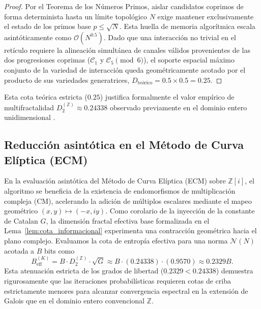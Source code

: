 \documentclass{article}
\numberwithin{equation}{section}
\theoremstyle{plain}
\theoremstyle{definition}
\begin{document}
\begin{proof}
Por el Teorema de los Números Primos, aislar candidatos coprimos de forma determinista hasta un límite topológico $N$ exige mantener exclusivamente el estado de los primos base $p \le \sqrt{N}$. Esta huella de memoria algorítmica escala asintóticamente como $\mathcal{O}(N^{0.5})$. Dado que una interacción no trivial en el retículo requiere la alineación simultánea de canales válidos provenientes de las dos progresiones coprimas ($\mathcal{C}_1$ y $\mathcal{C}_5 \pmod 6$), el soporte espacial máximo conjunto de la variedad de interacción queda geométricamente acotado por el producto de sus variedades generatrices, $D_{\text{teórico}} = 0.5 \times 0.5 = 0.25$.
\end{proof}

Esta cota teórica estricta ($0.25$) justifica formalmente el valor empírico de multifractalidad $D_2^{(\mathbb{Z})} \approx 0.24338$ observado previamente en el dominio entero unidimensional \cite{Peinador2026Hamiltonian}.

\subsection{Reducción asintótica en el Método de Curva Elíptica (ECM)}

En la evaluación asintótica del Método de Curva Elíptica (ECM) sobre $\mathbb{Z}[i]$, el algoritmo se beneficia de la existencia de endomorfismos de multiplicación compleja (CM), acelerando la adición de múltiplos escalares mediante el mapeo geométrico $(x, y) \mapsto (-x, iy)$.
Como corolario de la inyección de la constante de Catalan $G$, la dimensión fractal efectiva base formalizada en el Lema~\ref{lem:cota_informacional} experimenta una contracción geométrica hacia el plano complejo. Evaluamos la cota de entropía efectiva para una norma $\mathcal{N}(N)$ acotada a $B$ bits como
\begin{equation}
    B_{\text{eff}}^{(K)} = B \cdot D_2^{(\mathbb{Z})} \cdot \sqrt{G} \approx B \cdot (0.24338) \cdot (0.9570) \approx 0.2329 B.
\end{equation}
Esta atenuación estricta de los grados de libertad ($0.2329 < 0.24338$) demuestra rigurosamente que las iteraciones probabilísticas requieren cotas de criba estrictamente menores para alcanzar convergencia espectral en la extensión de Galois que en el dominio entero convencional $\mathbb{Z}$.

\end{document}
